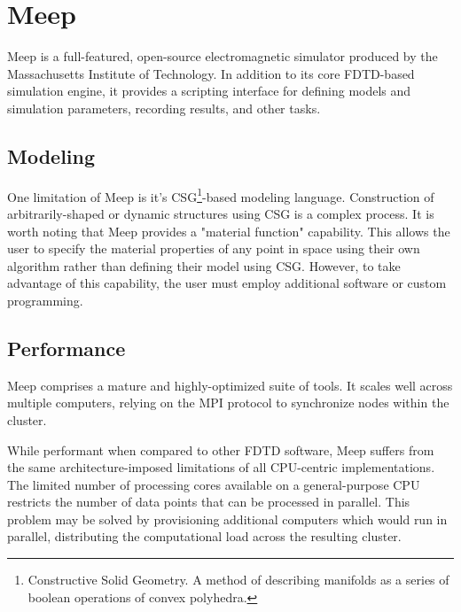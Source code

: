 \chapter{Meep} \label{ch:meep}

Meep\cite{OskooiRo10} is a full-featured, open-source electromagnetic simulator produced by the Massachusetts Institute of Technology. In addition to its core FDTD-based simulation engine, it provides a scripting interface for defining models and simulation parameters, recording results, and other tasks.  





\section{Modeling}

\iffalse
************************************************
While I may agree, you need to keep they hyperbole and sarcasm out.  You should re-write this section to state what Meep is, how it is used, and how you made use of some of it's features.  You can also look up how many citations it has (on their website) to showcase that it's widely used and trusted making it a valid point of comparison 
************************************************
\fi

One limitation of Meep is it's CSG\footnote{Constructive Solid Geometry. A method of describing manifolds as a series of boolean operations of convex polyhedra.}-based modeling language. Construction of arbitrarily-shaped or dynamic structures using CSG is a complex process. It is worth noting that Meep provides a "material function" capability. This allows the user to specify the material properties of any point in space using their own algorithm rather than defining their model using CSG. However, to take advantage of this capability, the user must employ additional software or custom programming. 

\section{Performance}

Meep comprises a mature and highly-optimized suite of tools. It scales well across multiple computers, relying on the MPI protocol to synchronize nodes within the cluster.

While performant when compared to other FDTD software, Meep suffers from the same architecture-imposed limitations of all CPU-centric implementations. The limited number of processing cores available on a general-purpose CPU restricts the number of data points that can be processed in parallel. This problem may be solved by provisioning additional computers which would run in parallel, distributing the computational load across the resulting cluster.

